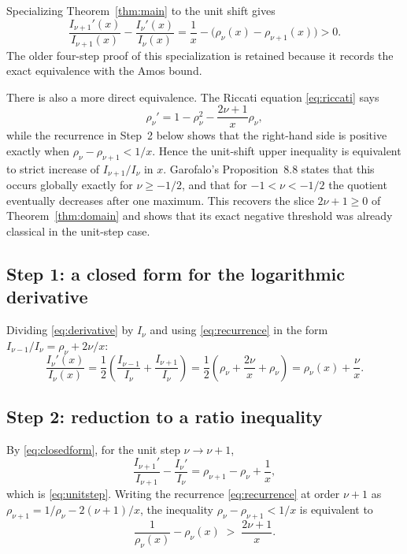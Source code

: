\documentclass[11pt]{article}
\theoremstyle{remark}
\begin{document}
Specializing Theorem~\ref{thm:main} to the unit shift gives
\begin{equation}
\label{eq:unitstep}
\frac{I_{\nu+1}'(x)}{I_{\nu+1}(x)}-
\frac{I_\nu'(x)}{I_\nu(x)}
=\frac1x-\bigl(\rho_\nu(x)-\rho_{\nu+1}(x)\bigr)>0.
\end{equation}
The older four-step proof of this specialization is retained because
it records the exact equivalence with the Amos bound.

There is also a more direct equivalence.  The Riccati equation
\eqref{eq:riccati} says
\[
 \rho_\nu'=1-\rho_\nu^2-\frac{2\nu+1}{x}\rho_\nu,
\]
while the recurrence in Step~2 below shows that the right-hand side is
positive exactly when
$\rho_\nu-\rho_{\nu+1}<1/x$.  Hence the unit-shift upper inequality is
equivalent to strict increase of $I_{\nu+1}/I_\nu$ in $x$.  Garofalo's
Proposition~8.8 \cite{Garofalo} states that this occurs globally exactly
for $\nu\ge-1/2$, and that for $-1<\nu<-1/2$ the quotient eventually
decreases after one maximum.  This recovers the slice
$2\nu+1\ge0$ of Theorem~\ref{thm:domain} and shows that its exact
negative threshold was already classical in the unit-step case.

\subsection*{Step 1: a closed form for the logarithmic derivative}

Dividing \eqref{eq:derivative} by $I_\nu$ and using
\eqref{eq:recurrence} in the form $I_{\nu-1}/I_\nu = \rho_\nu + 2\nu/x$:
\begin{equation}
\label{eq:closedform}
\frac{I_\nu'(x)}{I_\nu(x)}
= \frac12\left(\frac{I_{\nu-1}}{I_\nu} + \frac{I_{\nu+1}}{I_\nu}\right)
= \frac12\left(\rho_\nu + \frac{2\nu}{x} + \rho_\nu\right)
= \rho_\nu(x) + \frac{\nu}{x}.
\end{equation}

\subsection*{Step 2: reduction to a ratio inequality}

By \eqref{eq:closedform}, for the unit step $\nu \to \nu+1$,
\[
\frac{I_{\nu+1}'}{I_{\nu+1}} - \frac{I_\nu'}{I_\nu}
= \rho_{\nu+1} - \rho_\nu + \frac{1}{x},
\]
which is \eqref{eq:unitstep}. Writing the recurrence
\eqref{eq:recurrence} at order $\nu+1$ as
$\rho_{\nu+1} = 1/\rho_\nu - 2(\nu+1)/x$, the inequality
$\rho_\nu - \rho_{\nu+1} < 1/x$ is equivalent to
\begin{equation}
\label{eq:target}
\frac{1}{\rho_\nu(x)} - \rho_\nu(x) \;>\; \frac{2\nu+1}{x}.
\end{equation}
\end{document}
